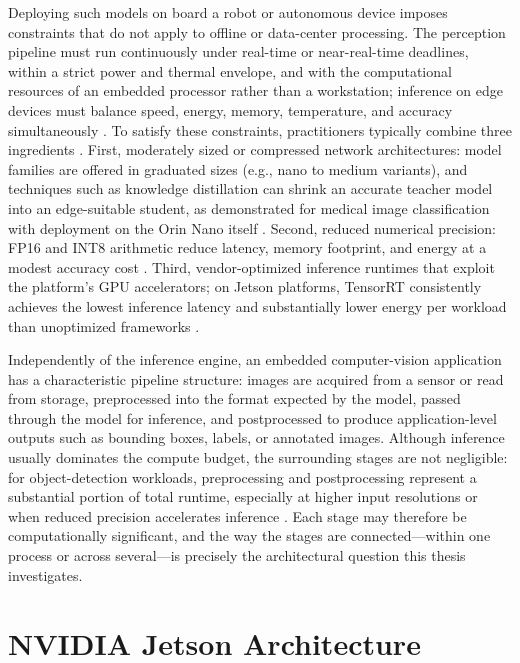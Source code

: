 Deploying such models on board a robot or autonomous device imposes
constraints that do not apply to offline or data-center processing. The
perception pipeline must run continuously under real-time or near-real-time
deadlines, within a strict power and thermal envelope, and with the
computational resources of an embedded processor rather than a workstation;
inference on edge devices must balance speed, energy, memory, temperature,
and accuracy simultaneously \cite{zequn2026}. To satisfy these constraints,
practitioners typically combine three ingredients
\cite{xu2025, szegedi2026, zequn2026}. First, moderately sized or
compressed network architectures: model families are offered in graduated
sizes (e.g., nano to medium variants), and techniques such as knowledge
distillation can shrink an accurate teacher model into an edge-suitable
student, as demonstrated for medical image classification with deployment
on the Orin Nano itself \cite{aalishah2025}. Second, reduced numerical
precision: FP16 and INT8 arithmetic reduce latency, memory footprint, and
energy at a modest accuracy cost \cite{szegedi2026, zequn2026}. Third,
vendor-optimized inference runtimes that exploit the platform's GPU
accelerators; on Jetson platforms, TensorRT consistently achieves the
lowest inference latency and substantially lower energy per workload than
unoptimized frameworks \cite{szegedi2026, zequn2026}.

Independently of the inference engine, an embedded computer-vision
application has a characteristic pipeline structure: images are acquired
from a sensor or read from storage, preprocessed into the format expected
by the model, passed through the model for inference, and postprocessed to
produce application-level outputs such as bounding boxes, labels, or
annotated images. Although inference usually dominates the compute budget,
the surrounding stages are not negligible: for object-detection workloads,
preprocessing and postprocessing represent a substantial portion of total
runtime, especially at higher input resolutions or when reduced precision
accelerates inference \cite{szegedi2026}. Each stage may therefore be
computationally significant, and the way the stages are
connected---within one process or across several---is precisely the
architectural question this thesis investigates.

\section{NVIDIA Jetson Architecture}
\label{sec:jetson}

